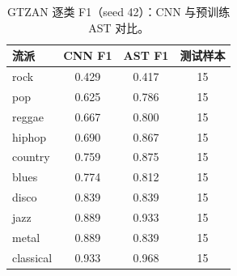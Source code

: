 \begin{table}[H]
\centering\small
\caption{GTZAN 逐类 F1（seed 42）：CNN 与预训练 AST 对比。}
\label{tab:perclass}
\begin{tabular}{lccc}
\toprule
流派 & CNN F1 & AST F1 & 测试样本\\
\midrule
rock & 0.429 & 0.417 & 15\\
pop & 0.625 & 0.786 & 15\\
reggae & 0.667 & 0.800 & 15\\
hiphop & 0.690 & 0.867 & 15\\
country & 0.759 & 0.875 & 15\\
blues & 0.774 & 0.812 & 15\\
disco & 0.839 & 0.839 & 15\\
jazz & 0.889 & 0.933 & 15\\
metal & 0.889 & 0.839 & 15\\
classical & 0.933 & 0.968 & 15\\
\bottomrule
\end{tabular}
\end{table}
